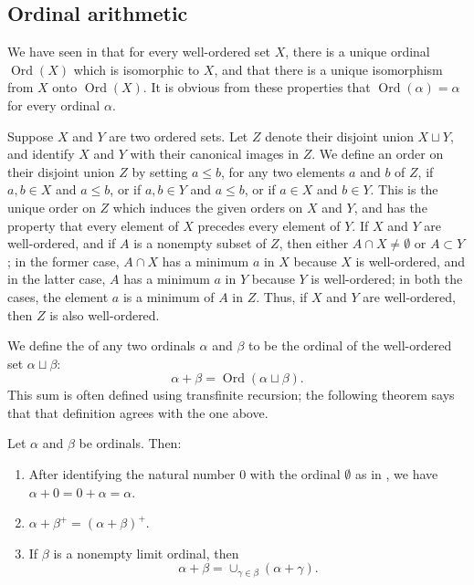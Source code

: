 \documentclass{article}
\begin{document}
\subsection{Ordinal arithmetic}
\label{sec:o0i16s30}

We have seen in  that for every well-ordered set
\(X\), there is a unique ordinal \(\operatorname{Ord}(X)\) which is
isomorphic to \(X\), and that there is a unique isomorphism from \(X\)
onto \(\operatorname{Ord}(X)\).  It is obvious from these properties
that \(\operatorname{Ord}(\alpha) = \alpha\) for every ordinal
\(\alpha\).

Suppose \(X\) and \(Y\) are two ordered sets.  Let \(Z\) denote their
disjoint union \(X \sqcup Y\), and identify \(X\) and \(Y\) with their
canonical images in \(Z\).  We define an order on their disjoint union
\(Z\) by setting \(a \leq b\), for any two elements \(a\) and \(b\) of
\(Z\), if \(a, b \in X\) and \(a \leq b\), or if \(a, b \in Y\) and
\(a \leq b\), or if \(a \in X\) and \(b \in Y\).  This is the unique
order on \(Z\) which induces the given orders on \(X\) and \(Y\), and
has the property that every element of \(X\) precedes every element of
\(Y\).  If \(X\) and \(Y\) are well-ordered, and if \(A\) is a
nonempty subset of \(Z\), then either \(A \cap X \neq \emptyset\) or
\(A \subset Y\); in the former case, \(A \cap X\) has a minimum \(a\)
in \(X\) because \(X\) is well-ordered, and in the latter case, \(A\)
has a minimum \(a\) in \(Y\) because \(Y\) is well-ordered; in both
the cases, the element \(a\) is a minimum of \(A\) in \(Z\).  Thus, if
\(X\) and \(Y\) are well-ordered, then \(Z\) is also well-ordered.

We define the  of any two ordinals \(\alpha\) and
\(\beta\) to be the ordinal of the well-ordered set
\(\alpha \sqcup \beta\):
\begin{displaymath}
  \alpha + \beta = \operatorname{Ord}(\alpha \sqcup \beta).
\end{displaymath}
This sum is often defined using transfinite recursion; the following
theorem says that that definition agrees with the one above.

\begin{theorem}
  \label{thm:8e0yiygg}
  Let \(\alpha\) and \(\beta\) be ordinals.  Then:
  \begin{enumerate}
  \item After identifying the natural number \(0\) with the ordinal
    \(\emptyset\) as in , we have
    \(\alpha + 0 = 0 + \alpha = \alpha\).
  \item \(\alpha + \beta^+ = (\alpha + \beta)^+\).
  \item If \(\beta\) is a nonempty limit ordinal, then
    \begin{displaymath}
      \alpha + \beta = \cup_{\gamma \in \beta} (\alpha + \gamma).
    \end{displaymath}
  \end{enumerate}
\end{theorem}
\end{document}
